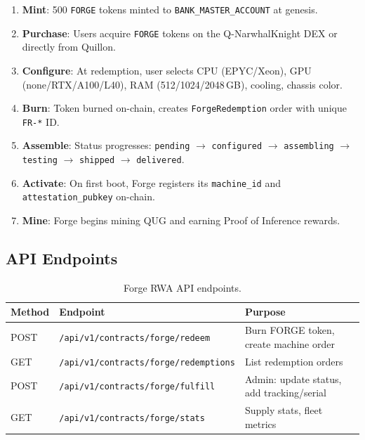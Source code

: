 \documentclass[11pt,a4paper]{article}
\begin{document}
\begin{enumerate}
    \item \textbf{Mint}: 500 \texttt{FORGE} tokens minted to \texttt{BANK\_MASTER\_ACCOUNT} at genesis.
    \item \textbf{Purchase}: Users acquire \texttt{FORGE} tokens on the Q-NarwhalKnight DEX or directly from Quillon.
    \item \textbf{Configure}: At redemption, user selects CPU (EPYC/Xeon), GPU (none/RTX/A100/L40), RAM (512/1024/2048\,GB), cooling, chassis color.
    \item \textbf{Burn}: Token burned on-chain, creates \texttt{ForgeRedemption} order with unique \texttt{FR-*} ID.
    \item \textbf{Assemble}: Status progresses: \texttt{pending} $\rightarrow$ \texttt{configured} $\rightarrow$ \texttt{assembling} $\rightarrow$ \texttt{testing} $\rightarrow$ \texttt{shipped} $\rightarrow$ \texttt{delivered}.
    \item \textbf{Activate}: On first boot, Forge registers its \texttt{machine\_id} and \texttt{attestation\_pubkey} on-chain.
    \item \textbf{Mine}: Forge begins mining QUG and earning Proof of Inference rewards.
\end{enumerate}

\subsection{API Endpoints}

\begin{table}[H]
\centering
\begin{tabular}{@{}llp{7cm}@{}}
\toprule
\textbf{Method} & \textbf{Endpoint} & \textbf{Purpose} \\
\midrule
POST & \texttt{/api/v1/contracts/forge/redeem} & Burn FORGE token, create machine order \\
GET & \texttt{/api/v1/contracts/forge/redemptions} & List redemption orders \\
POST & \texttt{/api/v1/contracts/forge/fulfill} & Admin: update status, add tracking/serial \\
GET & \texttt{/api/v1/contracts/forge/stats} & Supply stats, fleet metrics \\
\bottomrule
\end{tabular}
\caption{Forge RWA API endpoints.}
\end{table}

\end{document}
